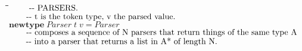 \documentclass{article}
\newlength{\lwidth}\setlength{\lwidth}{4.5cm}
\newlength{\cwidth}\setlength{\cwidth}{8mm} %
\newcommand{\Conid}[1]{\mathit{#1}}
\newcommand{\Varid}[1]{\mathit{#1}}
\begin{document}
\begin{tabbing}
\qquad\=\hspace{\lwidth}\=\hspace{\cwidth}\=\+\kill
${\mbox{\qquad-{}-  PARSERS.}}$\\
${\mbox{\qquad-{}-  t is the token type, v the parsed value. }}$\\
${\mathbf{newtype}\;\Conid{Parser}\;\Varid{t}\;\Varid{v}\mathrel{=}\Conid{Parser}}$\\
${}$\\
${}$\\
${}$\\
${}$\\
${}$\\
${}$\\
${}$\\
${}$\\
${}$\\
${\mbox{\qquad-{}-  composes a sequence of N parsers that return things of the same type A}}$\\
${\mbox{\qquad-{}-  into a parser that returns a list in A* of length N. }}$\\
${}$\\
${}$\\
${}$\\
${}$\\
${}$\\
${}$\\
${}$\\
${}$\\
${}$\\
${}$\\
${}$\\
${}$\\
${}$\\
${}$\\
${}$\\
${}$\\
${}$\\
${}$\\
${}$\\
${}$\\
${}$\\
${}$\\
${}$\\
${}$\\
${}$\\
${}$\\
${}$\\
${}$\\
${}$\\
${}$\\
${}$\\

\end{tabbing}
\end{document}
